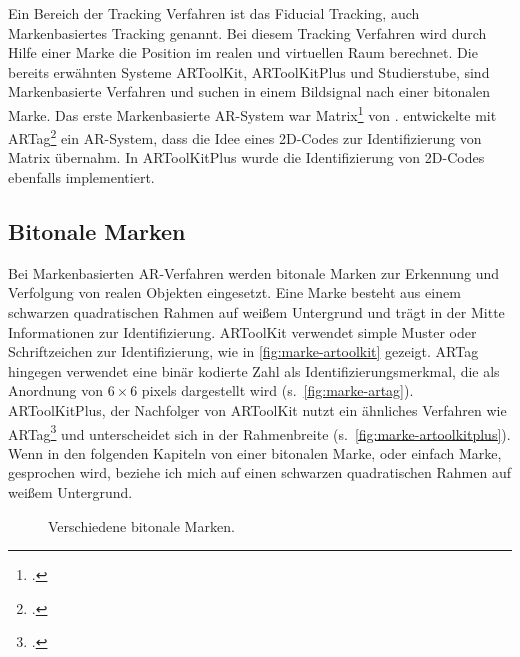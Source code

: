 Ein Bereich der Tracking Verfahren ist das Fiducial Tracking, auch Markenbasiertes Tracking genannt. Bei diesem
 Tracking Verfahren wird durch Hilfe einer Marke die Position im realen und virtuellen Raum berechnet. Die bereits
 erwähnten Systeme ARToolKit, ARToolKitPlus und Studierstube, sind Markenbasierte Verfahren und suchen in einem
 Bildsignal nach einer bitonalen Marke. Das erste Markenbasierte \gls{AR}-System war
 Matrix\footcite{rekimoto1998matrix} von \citeauthor{rekimoto1998matrix}. \citeauthor{fiala2004artaga} entwickelte mit
 ARTag\footcite{fiala2004artaga} ein \gls{AR}-System, dass die Idee eines 2D-Codes zur Identifizierung von Matrix
 übernahm. In ARToolKitPlus wurde die Identifizierung von 2D-Codes ebenfalls implementiert.

\subsection{Bitonale Marken} %
\label{sub:bitonalemarken}
Bei Markenbasierten \gls{AR}-Verfahren werden bitonale Marken zur Erkennung und Verfolgung von realen Objekten
 eingesetzt. Eine Marke besteht aus einem schwarzen quadratischen Rahmen auf weißem Untergrund und trägt in der Mitte
 Informationen zur Identifizierung. ARToolKit verwendet simple Muster oder Schriftzeichen zur Identifizierung, wie in
 \autoref{fig:marke-artoolkit} gezeigt. ARTag hingegen verwendet eine binär kodierte Zahl als Identifizierungsmerkmal,
 die als Anordnung von $6 \times 6$ \glspl{pixel} dargestellt wird (s.~\autoref{fig:marke-artag}). ARToolKitPlus, der
 Nachfolger von ARToolKit nutzt ein ähnliches Verfahren wie ARTag\footcite[Vgl.][S.~142]{wagner07b} und unterscheidet
 sich in der Rahmenbreite (s.~\autoref{fig:marke-artoolkitplus}). Wenn in den folgenden Kapiteln von einer bitonalen
 Marke, oder einfach Marke, gesprochen wird, beziehe ich mich auf einen schwarzen quadratischen Rahmen auf weißem
 Untergrund.

\begin{figure}[!ht]
	\centering
	\caption{Verschiedene bitonale Marken.
	}
	\label{fig:bitonale-marken}
\end{figure}

